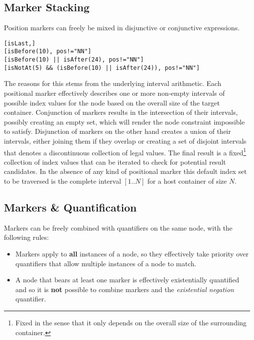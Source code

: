 \documentclass[11pt,a4paper]{report}
\begin{document}
\subsection{Marker Stacking}
\label{sec:marker-stacking}
Position markers can freely be mixed in disjunctive or conjunctive expressions.
\begin{Verbatim}[samepage=true]
[isLast,]
[isBefore(10), pos!="NN"]
[isBefore(10) || isAfter(24), pos!="NN"]
[isNotAt(5) && (isBefore(10) || isAfter(24)), pos!="NN"]
\end{Verbatim}
The reasons for this stems from the underlying interval arithmetic.
Each positional marker effectively describes one or more non-empty intervals of possible index values for the node based on the overall size of the target container.
Conjunction of markers results in the intersection of their intervals, possibly creating an empty set, which will render the node constraint impossible to satisfy.
Disjunction of markers on the other hand creates a union of their intervals, either joining them if they overlap or creating a set of disjoint intervals that denotes a discontinuous collection of legal values.
The final result is a fixed\footnote{Fixed in the sense that it only depends on the overall size of the surrounding container.} collection of index values that can be iterated to check for potential result candidates.
In the absence of any kind of positional marker this default index set to be traversed is the complete interval $[1..N]$ for a host container of size $N$.

\subsection{Markers \& Quantification}
\label{sec:marker-quantification}
Markers can be freely combined with quantifiers on the same node, with the following rules:
\begin{itemize}
	\item Markers apply to \textbf{all} instances of a node, so they effectively take priority over quantifiers that allow multiple instances of a node to match.
	\item A node that bears at least one marker is effectively existentially quantified and so it is \textbf{not} possible to combine markers and the \textit{existential negation} quantifier.
\end{itemize}
\end{document}

